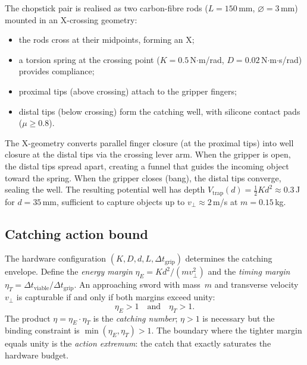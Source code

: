 The chopstick pair is realised as two carbon-fibre rods
($L = 150$\,mm, $\varnothing = 3$\,mm) mounted in an
X-crossing geometry:
\begin{itemize}[nosep]
  \item the rods cross at their midpoints, forming an X;
  \item a torsion spring at the crossing point
  ($K = 0.5$\,N$\cdot$m/rad,
  $D = 0.02$\,N$\cdot$m$\cdot$s/rad) provides compliance;
  \item proximal tips (above crossing) attach to the gripper
  fingers;
  \item distal tips (below crossing) form the catching well,
  with silicone contact pads ($\mu \geq 0.8$).
\end{itemize}
The X-geometry converts parallel finger closure (at the
proximal tips) into well closure at the distal tips via the
crossing lever arm.  When the gripper is open, the distal
tips spread apart, creating a funnel that guides the
incoming object toward the spring.  When the gripper closes
(bang), the distal tips converge, sealing the well.
The resulting potential well has depth
$V_{\mathrm{trap}}(d) = \frac{1}{2}Kd^2 \approx 0.3$\,J
for $d = 35$\,mm, sufficient to capture objects up to
$v_\perp \approx 2$\,m/s at $m = 0.15$\,kg.

\subsection{Catching action bound}

\begin{proposition}
\label{prop:c-action-bound}
The hardware configuration
$(K, D, d, L, \Delta t_{\mathrm{grip}})$ determines the
catching envelope.  Define the \emph{energy margin}
$\eta_E = Kd^2/(mv_\perp^2)$ and the \emph{timing margin}
$\eta_T = \Delta t_{\mathrm{viable}} /
\Delta t_{\mathrm{grip}}$.  An approaching sword with
mass~$m$ and transverse velocity~$v_\perp$ is capturable if
and only if both margins exceed unity:
\[
  \eta_E > 1 \quad\text{and}\quad \eta_T > 1.
\]
The product $\eta = \eta_E \cdot \eta_T$ is the
\emph{catching number}; $\eta > 1$ is necessary but the
binding constraint is $\min(\eta_E, \eta_T) > 1$.  The
boundary where the tighter margin equals unity is the
\emph{action extremum}: the catch that exactly saturates
the hardware budget.
\end{proposition}

